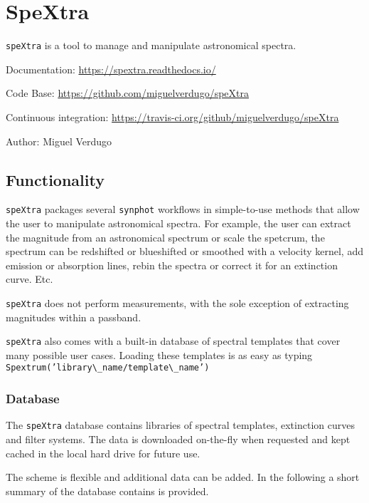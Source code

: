 

\section{SpeXtra%
  \label{spextra}%
}

\texttt{speXtra} is a tool to manage and manipulate astronomical spectra.

Documentation: \url{https://spextra.readthedocs.io/}

Code Base: \url{https://github.com/miguelverdugo/speXtra}

Continuous integration: \url{https://travis-ci.org/github/miguelverdugo/speXtra}

Author: Miguel Verdugo


\subsection{Functionality%
  \label{functionality}%
}

\texttt{speXtra} packages several \texttt{synphot} workflows in simple-to-use methods that allow the user
to manipulate astronomical spectra. For example, the user
can extract the magnitude from an astronomical spectrum or
scale the spetcrum, the spectrum can be redshifted or
blueshifted or smoothed with a velocity kernel, add emission or absorption lines, rebin the spectra or correct it for an extinction curve. Etc.

\texttt{speXtra} does not perform measurements, with the sole exception of extracting magnitudes within a passband.

\texttt{speXtra} also comes with a built-in database of spectral templates  that cover many possible user cases. Loading these templates is as easy as typing \texttt{Spextrum('library\textbackslash{}\_name/template\textbackslash{}\_name')}


\subsubsection{Database%
  \label{database}%
}

The \texttt{speXtra} database contains libraries of spectral templates, extinction curves and filter systems.
The data is downloaded on-the-fly when requested and kept cached in the local hard drive for future use.

The scheme is flexible and additional data can be added.
In the following a short summary of the database contains is provided.


